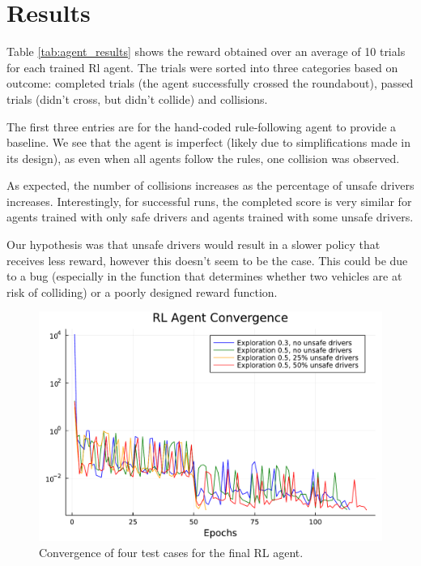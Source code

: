 \documentclass[conference]{IEEEtran}
\begin{document}
\section{Results}
Table \ref{tab:agent_results} shows the reward obtained over an average of 10 trials for each trained Rl agent. The trials were sorted into three categories based on outcome: completed trials (the agent successfully crossed the roundabout), passed trials (didn't cross, but didn't collide) and collisions.

The first three entries are for the hand-coded rule-following agent to provide a baseline. We see that the agent is imperfect (likely due to simplifications made in its design), as even when all agents follow the rules, one collision was observed.

As expected, the number of collisions increases as the percentage of unsafe drivers increases. Interestingly, for successful runs, the completed score is very similar for agents trained with only safe drivers and agents trained with some unsafe drivers.

Our hypothesis was that unsafe drivers would result in a slower policy that receives less reward, however this doesn't seem to be the case. This could be due to a bug (especially in the function that determines whether two vehicles are at risk of colliding) or a poorly designed reward function.

\begin{figure}[h]
	\centering
	\includegraphics[width=1.0\linewidth]{figures/final_convergence.pdf}
	\caption{Convergence of four test cases for the final RL agent.}
	\label{fig:convergence}
\end{figure}
\end{document}
